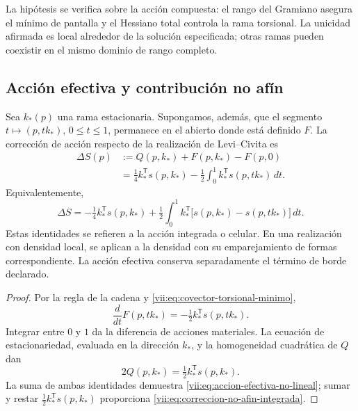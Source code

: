 La hipótesis se verifica sobre la acción compuesta: el rango del
Gramiano asegura el mínimo de pantalla y el Hessiano total controla
la rama torsional. La unicidad afirmada es local alrededor de la
solución especificada; otras ramas pueden coexistir en el mismo
dominio de rango completo.

\subsection{Acción efectiva y contribución no afín}
\label{vii:subsec:accion-efectiva-no-afin}

\begin{theorem}
\label{vii:thm:eliminacion-torsional-no-lineal}
Sea \(k_*(p)\) una rama estacionaria. Supongamos, además, que el
segmento \(t\mapsto (p,tk_*)\), \(0\leq t\leq1\), permanece
en el abierto donde está definido \(F\). La corrección de acción
respecto de la realización de Levi--Civita es
\begin{equation}
 \begin{split}
 \Delta S(p)
  &:=Q(p,k_*)+F(p,k_*)-F(p,0)\\
  &=\tfrac14 k_*^{\mathsf T}s(p,k_*)
     -\tfrac12\int_0^1
           k_*^{\mathsf T}s(p,tk_*)\,dt.
 \end{split}
 \label{vii:eq:accion-efectiva-no-lineal}
\end{equation}
Equivalentemente,
\begin{equation}
 \Delta S=-\tfrac14 k_*^{\mathsf T}s(p,k_*)
  +\tfrac12\int_0^1 k_*^{\mathsf T}
       \bigl[s(p,k_*)-s(p,tk_*)\bigr]\,dt.
 \label{vii:eq:correccion-no-afin-integrada}
\end{equation}
Estas identidades se refieren a la acción integrada o celular.
En una realización con densidad local, se aplican a la densidad
con su emparejamiento de formas correspondiente. La acción efectiva
conserva separadamente el término de borde declarado.
\end{theorem}

\begin{proof}
Por la regla de la cadena y
\eqref{vii:eq:covector-torsional-minimo},
\[
 \frac{d}{dt}F(p,tk_*)
      =-\tfrac12 k_*^{\mathsf T}s(p,tk_*).
\]
Integrar entre \(0\) y \(1\) da la diferencia de acciones
materiales. La ecuación de estacionariedad, evaluada en la
dirección \(k_*\), y la homogeneidad cuadrática de \(Q\) dan
\[
 2Q(p,k_*)=\tfrac12 k_*^{\mathsf T}s(p,k_*).
\]
La suma de ambas identidades demuestra
\eqref{vii:eq:accion-efectiva-no-lineal}; sumar y restar
\(\tfrac12k_*^{\mathsf T}s(p,k_*)\) proporciona
\eqref{vii:eq:correccion-no-afin-integrada}.
\end{proof}


